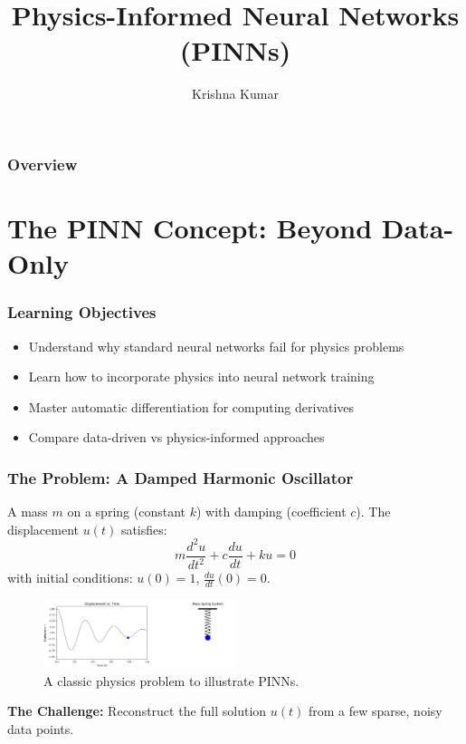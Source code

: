 \documentclass[notes]{beamer}
\title[Physics-Informed Neural Networks]{Physics-Informed Neural Networks (PINNs)}
\author{Krishna Kumar} %
\institute[UT Austin] %
{
University of Texas at Austin \\
\medskip
\textit{
  \url{krishnak@utexas.edu}} %
}
\date{} %
\begin{document}
\begin{frame}
\titlepage %
\end{frame}

\begin{frame}
 \frametitle{Overview}
 \tableofcontents
\end{frame}


\section{The PINN Concept: Beyond Data-Only}

\begin{frame}
\frametitle{Learning Objectives}

\begin{itemize}
    \item Understand why standard neural networks fail for physics problems
    \item Learn how to incorporate physics into neural network training
    \item Master automatic differentiation for computing derivatives
    \item Compare data-driven vs physics-informed approaches
\end{itemize}

\vspace{1cm}
\centering
\href{https://colab.research.google.com/github/kks32-courses/ut-portugal-sciml/blob/main/docs/01-pinn/pinn.ipynb}{}

\end{frame}

\begin{frame}
\frametitle{The Problem: A Damped Harmonic Oscillator}

A mass $m$ on a spring (constant $k$) with damping (coefficient $c$). The displacement $u(t)$ satisfies:
\begin{equation*}
m \frac{d^2 u}{dt^2} + c \frac{du}{dt} + ku = 0
\end{equation*}
with initial conditions: $u(0) = 1$, $\frac{du}{dt}(0) = 0$.

\begin{figure}[ht]
	\centering
	\includegraphics[width=0.5\textwidth]{figs/harmonic-oscillator.png}
	\caption*{A classic physics problem to illustrate PINNs.}
\end{figure}

\textbf{The Challenge:} Reconstruct the full solution $u(t)$ from a few sparse, noisy data points.

\end{frame}
\end{document}

